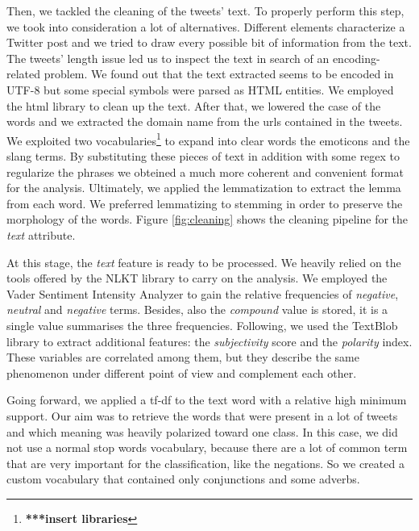 \documentclass[conference]{IEEEtran}
\begin{document}
Then, we tackled the cleaning of the tweets' text. To properly perform this step, we took into consideration a lot of alternatives. Different elements characterize a Twitter post and we tried to draw every possible bit of information from the text. The tweets' length issue led us to inspect the text in search of an encoding-related problem. We found out that the text extracted seems to be encoded in UTF-8\cite{utf8} but some special symbols were parsed as HTML entities\cite{html_entities}. We employed the html library to clean up the text. After that, we lowered the case of the words and we extracted the domain name from the urls contained in the tweets. We exploited two vocabularies\footnote{\textbf{***insert libraries}} to expand into clear words the emoticons and the slang terms. By substituting these pieces of text in addition with some regex to regularize the phrases we obteined a much more coherent and convenient format for the analysis. Ultimately, we applied the lemmatization\cite{lemmatization} to extract the lemma from each word. We preferred lemmatizing to stemming\cite{stemming} in order to preserve the morphology of the words\cite{stemmingVSlemmatizing}.
Figure \ref{fig:cleaning} shows the cleaning pipeline for the \textit{text} attribute.

At this stage, the \textit{text} feature is ready to be processed. We heavily relied on the tools offered by the NLKT library\cite{nlkt} to carry on the analysis. We employed the Vader Sentiment Intensity Analyzer\cite{vader} to gain the relative frequencies of \textit{negative}, \textit{neutral} and \textit{negative} terms. Besides, also the \textit{compound} value is stored, it is a single value summarises the three frequencies. Following, we used the TextBlob library\cite{textblob} to extract additional features: the \textit{subjectivity} score and the \textit{polarity} index. These variables are correlated among them, but they describe the same phenomenon under different point of view and complement each other.

Going forward, we applied a tf-df to the text word with a relative high minimum support. Our aim was to retrieve the words that were present in a lot of tweets and which meaning was heavily polarized toward one class. In this case, we did not use a normal stop words vocabulary, because there are a lot of common term that are very important for the classification, like the negations. So we created a custom vocabulary that contained only conjunctions and some adverbs.
\end{document}
